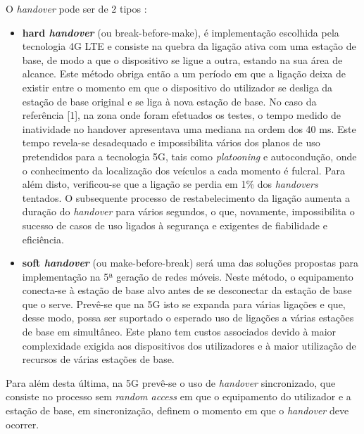 \documentclass{llncs}
\begin{document}
O \textit{handover} pode ser de 2 tipos :
\begin{itemize}
    \item \textbf{hard \textit{handover}} (ou break-before-make), é implementação escolhida pela tecnologia 4G LTE e consiste na quebra da ligação ativa com uma estação de base, de modo a que o dispositivo se ligue a outra, estando na sua área de alcance. Este método obriga então a um período em que a ligação deixa de existir entre o momento em que o dispositivo do utilizador se desliga da estação de base original e se liga à nova estação de base. No caso da referência [1], na zona onde foram efetuados os testes, o tempo medido de inatividade no handover apresentava uma mediana na ordem dos 40 ms. Este tempo revela-se desadequado e impossibilita vários dos planos de uso pretendidos para a tecnologia 5G, tais como \textit{platooning} e autocondução, onde o conhecimento da localização dos veículos a cada momento é fulcral. Para além disto, verificou-se que a ligação se perdia em 1\% dos \textit{handovers} tentados. O subsequente processo de restabelecimento da ligação aumenta a duração do \textit{handover} para vários segundos, o que, novamente, impossibilita o sucesso de casos de uso ligados à segurança e exigentes de fiabilidade e eficiência.
    \item \textbf{soft \textit{handover}} (ou make-before-break) será uma das soluções propostas para implementação na 5ª geração de redes móveis. Neste método, o equipamento conecta-se à estação de base alvo antes de se desconectar da estação de base que o serve. Prevê-se que na 5G isto se expanda para várias ligações e que, desse modo, possa ser suportado o esperado uso de ligações a várias estações de base em simultâneo. Este plano tem custos associados devido à maior complexidade exigida aos dispositivos dos utilizadores e à maior utilização de recursos de várias estações de base.
\end{itemize}

Para além desta última, na 5G prevê-se o uso de \textit{handover} sincronizado, que consiste no processo sem \textit{random access} em que o equipamento do utilizador e a estação de base, em sincronização, definem o momento em que o \textit{handover} deve ocorrer.
\end{document}
